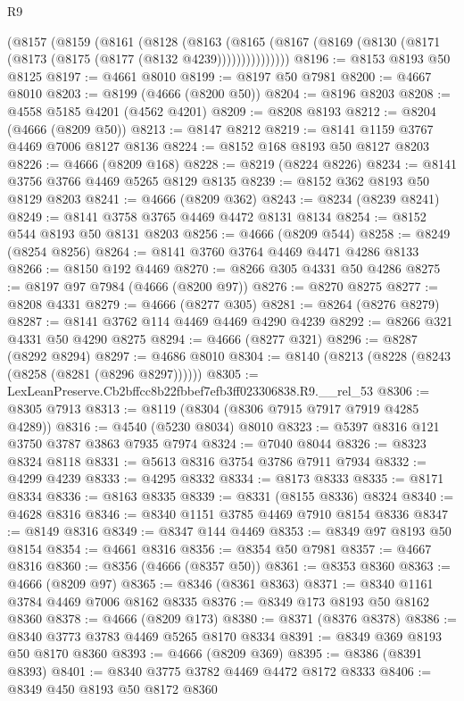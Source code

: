 \begin{lexlean}{R9}
\begin{coremodule}
      (@8157
        (@8159
          (@8161
            (@8128
              (@8163
                (@8165 (@8167 (@8169 (@8130 (@8171 (@8173 (@8175 (@8177 (@8132 @4239)))))))))))))))
@8196 := @8153 @8193 @50 @8125
@8197 := @4661 @8010
@8199 := @8197 @50 @7981
@8200 := @4667 @8010
@8203 := @8199 (@4666 (@8200 @50))
@8204 := @8196 @8203
@8208 := @4558 @5185 @4201 (@4562 @4201)
@8209 := @8208 @8193
@8212 := @8204 (@4666 (@8209 @50))
@8213 := @8147 @8212
@8219 := @8141 @1159 @3767 @4469 @7006 @8127 @8136
@8224 := @8152 @168 @8193 @50 @8127 @8203
@8226 := @4666 (@8209 @168)
@8228 := @8219 (@8224 @8226)
@8234 := @8141 @3756 @3766 @4469 @5265 @8129 @8135
@8239 := @8152 @362 @8193 @50 @8129 @8203
@8241 := @4666 (@8209 @362)
@8243 := @8234 (@8239 @8241)
@8249 := @8141 @3758 @3765 @4469 @4472 @8131 @8134
@8254 := @8152 @544 @8193 @50 @8131 @8203
@8256 := @4666 (@8209 @544)
@8258 := @8249 (@8254 @8256)
@8264 := @8141 @3760 @3764 @4469 @4471 @4286 @8133
@8266 := @8150 @192 @4469
@8270 := @8266 @305 @4331 @50 @4286
@8275 := @8197 @97 @7984 (@4666 (@8200 @97))
@8276 := @8270 @8275
@8277 := @8208 @4331
@8279 := @4666 (@8277 @305)
@8281 := @8264 (@8276 @8279)
@8287 := @8141 @3762 @114 @4469 @4469 @4290 @4239
@8292 := @8266 @321 @4331 @50 @4290 @8275
@8294 := @4666 (@8277 @321)
@8296 := @8287 (@8292 @8294)
@8297 := @4686 @8010
@8304 := @8140 (@8213 (@8228 (@8243 (@8258 (@8281 (@8296 @8297))))))
@8305 := LexLeanPreserve.Cb2bffcc8b22fbbef7efb3ff023306838.R9.__rel_53
@8306 := @8305 @7913
@8313 := @8119 (@8304 (@8306 @7915 @7917 @7919 @4285 @4289))
@8316 := @4540 (@5230 @8034) @8010
@8323 := @5397 @8316 @121 @3750 @3787 @3863 @7935 @7974
@8324 := @7040 @8044
@8326 := @8323 @8324 @8118
@8331 := @5613 @8316 @3754 @3786 @7911 @7934
@8332 := @4299 @4239
@8333 := @4295 @8332
@8334 := @8173 @8333
@8335 := @8171 @8334
@8336 := @8163 @8335
@8339 := @8331 (@8155 @8336) @8324
@8340 := @4628 @8316
@8346 := @8340 @1151 @3785 @4469 @7910 @8154 @8336
@8347 := @8149 @8316
@8349 := @8347 @144 @4469
@8353 := @8349 @97 @8193 @50 @8154
@8354 := @4661 @8316
@8356 := @8354 @50 @7981
@8357 := @4667 @8316
@8360 := @8356 (@4666 (@8357 @50))
@8361 := @8353 @8360
@8363 := @4666 (@8209 @97)
@8365 := @8346 (@8361 @8363)
@8371 := @8340 @1161 @3784 @4469 @7006 @8162 @8335
@8376 := @8349 @173 @8193 @50 @8162 @8360
@8378 := @4666 (@8209 @173)
@8380 := @8371 (@8376 @8378)
@8386 := @8340 @3773 @3783 @4469 @5265 @8170 @8334
@8391 := @8349 @369 @8193 @50 @8170 @8360
@8393 := @4666 (@8209 @369)
@8395 := @8386 (@8391 @8393)
@8401 := @8340 @3775 @3782 @4469 @4472 @8172 @8333
@8406 := @8349 @450 @8193 @50 @8172 @8360

\end{coremodule}
\end{lexlean}
